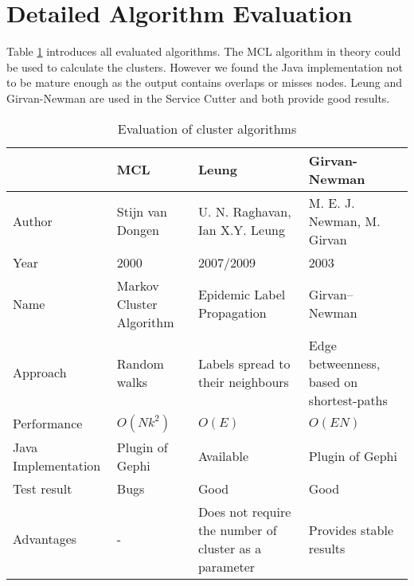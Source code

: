 \section{Detailed Algorithm Evaluation}
\label{appendix:graphClusteringAlgs}

Table \ref{tab:clusterAlgorithms} introduces all evaluated algorithms. The \gls{MCL} algorithm in theory could be used to calculate the clusters. However we found the Java implementation not to be mature enough as the output contains overlaps or misses nodes. Leung and Girvan-Newman are used in the Service Cutter and both provide good results.

\begin{table}[H]
\centering
\caption{Evaluation of cluster algorithms}
\label{tab:clusterAlgorithms}
\begin{tabular}{|p{2cm}|p{4cm}|p{4cm}|p{4cm}|}
\hline
                    & \textbf{MCL}               & \textbf{Leung}                    & \textbf{Girvan-Newman}  \\ \hline
Author              & Stijn van Dongen\cite{markovCluster} & U. N. Raghavan\cite{raghavan}, Ian X.Y. Leung\cite{leung}    & M. E. J. Newman, M. Girvan\cite{girvan} \\ \hline
Year                & 2000                       & 2007/2009                         & \multicolumn{1}{l|}{2003}                       \\ \hline
Name                & Markov Cluster Algorithm   & Epidemic Label Propagation        & \multicolumn{1}{l|}{Girvan–Newman}              \\ \hline
Approach            & Random walks               & Labels spread to their neighbours & Edge betweenness, based on shortest-paths       \\ \hline
Performance         & $O (N k^2)$                & $O( E )$                          & $O ( E N )$       \\ \hline
Java Implementation & Plugin of Gephi\cite{gephiMarkov} & Available\cite{leungGraphstream} & Plugin of Gephi\cite{leungGraphstream} \\ \hline
Test result         & Bugs                       & Good                              & \multicolumn{1}{l|}{Good}                       \\ \hline
Advantages & - & Does not require the number of cluster as a parameter & Provides stable results \\
 \hline
\end{tabular}
\end{table}
